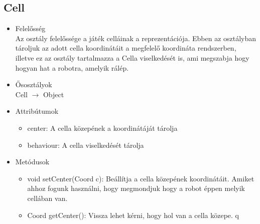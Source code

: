 
\subsection{Cell}
\begin{itemize}
\item Felelősség\\
Az osztály felelőssége a játék celláinak a reprezentációja. Ebben az osztályban tároljuk az adott cella koordinátáit a megfelelő koordináta rendszerben, illetve ez az osztály tartalmazza a Cella viselkedését is, ami megszabja hogy hogyan hat a robotra, amelyik rálép.

\item Ősosztályok\\
\newline
Cell $\rightarrow$ Object
\item Attribútumok\\
	\begin{itemize}
		\item center: A cella közepének a koordinátáját tárolja
		\item behaviour: A cella viselkedését tárolja
	\end{itemize}
\item Metódusok\\
	\begin{itemize}
		\item void setCenter(Coord c): Beállítja a cella közepének koordinátáit. Amiket ahhoz fogunk használni, hogy megmondjuk hogy a robot éppen melyik cellában van.
		\item Coord getCenter(): Vissza lehet kérni, hogy hol van a cella közepe.
		q
	\end{itemize}
\end{itemize}

